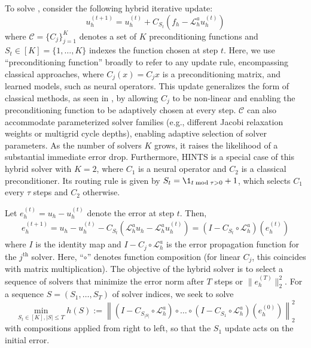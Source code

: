 \documentclass{article} %
\begin{document}
To solve , consider the following hybrid iterative update:
\begin{equation}
     u^{\left(t + 1\right)}_h = u^{\left(t\right)}_h + C_{S_t}\left(f_h - \mathcal{L}_h^au^{\left(t \right)}_h\right)
\end{equation}
where $\mathcal{C} =\{C_{j}\}_{j = 1}^K$ denotes a set of $K$ preconditioning functions and $S_t \in [K] = \{1, \dots, K\}$ indexes the function chosen at step $t$. Here, we use ``preconditioning function'' broadly to refer to any update rule, encompassing classical approaches, where $C_j(x) = C_jx$ is a preconditioning matrix, and learned models, such as neural operators. 
This update generalizes the form of classical methods, as seen in , by allowing $C_j$ to be non-linear and enabling the preconditioning function to be adaptively chosen at every step. $\mathcal{C}$ can also accommodate parameterized solver families (e.g., different Jacobi relaxation weights or multigrid cycle depths), enabling adaptive selection of solver parameters.  As the number of solvers $K$ grows, it raises the likelihood of a substantial immediate error drop. Furthermore, HINTS \citep{zhang2024blending} is a special case of this hybrid solver with $K = 2$, where  $C_1$ is a neural operator and $C_2$ is a classical preconditioner. Its routing rule is given by $S_t = \1_{t \bmod \tau > 0} + 1$, which selects $C_1$ every $\tau$ steps and $C_2$ otherwise.

Let $e^{(t)}_h = u_h - u^{(t)}_h$ denote the error at step $t$. Then, 
\begin{align*}
    e^{(t + 1)}_h = u_h -  u^{(t)}_h -C_{S_t}\left(\mathcal{L}_h^au_h - \mathcal{L}_h^au^{\left(t\right)}_h\right) = \left(I- C_{S_t} \circ \mathcal{L}_h^a\right)(e^{(t)}_h)
\end{align*}
where $I$ is the identity map and $I - C_{j} \circ\mathcal{L}_h^a$ is the error propagation function for the $j^{\text{th}}$ solver. Here, ``$\circ$'' denotes function composition (for linear $C_{j}$, this coincides with matrix multiplication).
The objective of the hybrid solver is to select a sequence of solvers that minimize the error norm after $T$ steps or $\|e^{(T)}_h\|_2^2$. For a sequence $S = (S_1, \dots, S_T)$ of solver indices,  we seek to solve 
\begin{equation} \label{eq:errorobjective}
    \min_{S_t \in [K], |S| \leq T} h(S) := \left\|\left(I - C_{S_{|S|}} \circ \mathcal{L}_h^a\right) \circ \dots \circ \left(I - C_{S_1} \circ \mathcal{L}_h^a\right)  \left(e^{(0)}_h \right)\right\|^2_2
\end{equation}
with compositions applied from right to left, so that the $S_1$ update acts on the initial error.
\end{document}
